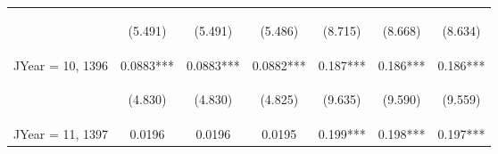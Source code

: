 \documentclass[]{article}
\begin{document}
\begin{center}
\begin{tabular}{lcccccc}
        \vspace{4pt}     & \begin{footnotesize}(5.491)\end{footnotesize}  & \begin{footnotesize}(5.491)\end{footnotesize}  & \begin{footnotesize}(5.486)\end{footnotesize}  & \begin{footnotesize}(8.715)\end{footnotesize}   & \begin{footnotesize}(8.668)\end{footnotesize}  & \begin{footnotesize}(8.634)\end{footnotesize}  \\
        JYear = 10, 1396 & 0.0883***                                      & 0.0883***                                      & 0.0882***                                      & 0.187***                                        & 0.186***                                       & 0.186***                                       \\
        \vspace{4pt}     & \begin{footnotesize}(4.830)\end{footnotesize}  & \begin{footnotesize}(4.830)\end{footnotesize}  & \begin{footnotesize}(4.825)\end{footnotesize}  & \begin{footnotesize}(9.635)\end{footnotesize}   & \begin{footnotesize}(9.590)\end{footnotesize}  & \begin{footnotesize}(9.559)\end{footnotesize}  \\
        JYear = 11, 1397 & 0.0196                                         & 0.0196                                         & 0.0195                                         & 0.199***                                        & 0.198***                                       & 0.197***                                       \\

\end{tabular}
\end{center}
\end{document}
